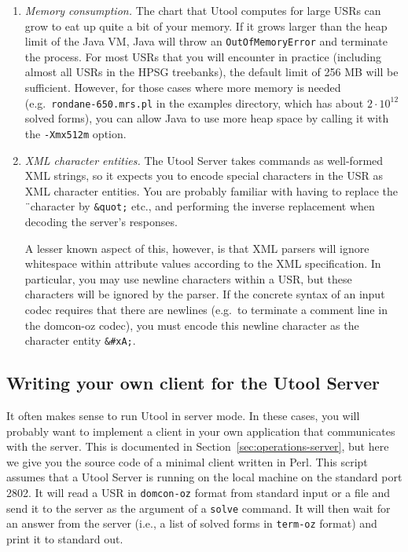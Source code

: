 \begin{enumerate}
\item \textit{Memory consumption.} The chart that Utool computes for
large USRs can grow to eat up quite a bit of your memory. If it grows
larger than the heap limit of the Java VM, Java will throw an
\verb?OutOfMemoryError? and terminate the process. For most USRs that
you will encounter in practice (including almost all USRs in the HPSG
treebanks), the default limit of 256 MB will be sufficient. However,
for those cases where more memory is needed (e.g.\
\verb?rondane-650.mrs.pl? in the examples directory, which has about
$2 \cdot 10^{12}$ solved forms), you can allow Java to use more heap
space by calling it with the \verb?-Xmx512m? option.

\item \textit{XML character entities.} The Utool Server takes commands
as well-formed XML strings, so it expects you to encode special
characters in the USR as XML character entities. You are probably
familiar with having to replace the \"\ character by \verb?&quot;?
etc., and performing the inverse replacement when decoding the
server's responses.

A lesser known aspect of this, however, is that XML parsers will
ignore whitespace within attribute values according to the XML
specification. In particular, you may use newline characters within a
USR, but these characters will be ignored by the parser. If the
concrete syntax of an input codec requires that there are newlines
(e.g.\ to terminate a comment line in the domcon-oz codec), you must
encode this newline character as the character entity \verb?&#xA;?.
\end{enumerate}




\subsection{Writing your own client for the Utool Server}
\label{sec:practice-client}

It often makes sense to run Utool in server mode. In these cases, you
will probably want to implement a client in your own application that
communicates with the server. This is documented in
Section~\ref{sec:operations-server}, but here we give you the source
code of a minimal client written in Perl. This script assumes that a
Utool Server is running on the local machine on the standard port
2802. It will read a USR in \verb?domcon-oz? format from standard
input or a file and send it to the server as the argument of a
\verb?solve? command. It will then wait for an answer from the server
(i.e., a list of solved forms in \verb?term-oz? format) and print it
to standard out.

